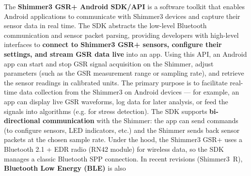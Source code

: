 The \textbf{Shimmer3 GSR+ Android SDK/API} is a software toolkit that enables
Android applications to communicate with Shimmer3 devices and capture
their sensor data in real time. The SDK abstracts the low-level
Bluetooth communication and sensor packet parsing, providing developers
with high-level interfaces to \textbf{connect to Shimmer3 GSR+ sensors,
configure their settings, and stream GSR data live} into an
app\cite{GSRFacialThermal2021}.
Using this API, an Android app can start and stop GSR signal acquisition
on the Shimmer, adjust parameters (such as the GSR measurement range or
sampling rate), and retrieve the sensor readings in calibrated units.
The primary purpose is to facilitate real-time data collection from the
Shimmer3 on Android devices --- for example, an app can display live GSR
waveforms, log data for later analysis, or feed the signals into
algorithms (e.g. for stress detection). The SDK supports
\textbf{bi-directional communication} with the Shimmer: the app can send
commands (to configure sensors, LED indicators, etc.) and the Shimmer
sends back sensor packets at the chosen sample rate. Under the hood, the
Shimmer3 GSR+ uses a Bluetooth 2.1 + EDR radio (RN42
module)\cite{StressDefinitionHH}
for wireless data, so the SDK manages a classic Bluetooth SPP
connection. In recent revisions (Shimmer3 R), \textbf{Bluetooth Low Energy
(BLE)} is also
